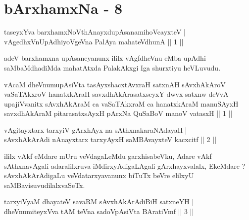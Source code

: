 \chapter{bArxhamxNa - 8}

\begin{shl}
taseyxYva barxhamxNoV\s thAnayxdupAsanamihoVcayxteV | \\
vAgedhxVnUpAdhiyoVgeVna PalAya mahateV\s dhunA \hfill ||  1 || 
\end{shl}

\begin{artha}
adeV barxhamxna upAsaneyanunx ililx vAgfdheVnu eMba upAdhi saMbaMdhadiMda mahatAtxda PalakAkxgi Iga shurxtiyu heVLuvudu.
\end{artha}

\begin{shl}
vAcaM dheVnumupAsiVta tasAyxshacxtAvxraH satxnAH sAvxhAkAroV vaSaTAkxroV hanatxkAraH savxdhAkArasatxseyxY dwvx satxnw deVvA upajiVvanitx sAvxhAkAraM ca vaSaTAkxraM ca hanatxkAraM manuSAyxH savxdhAkAraM pitarasatxsAyxH pArxNa QuSaBoV manoV vatasxH || 1 ||
\end{shl}


\begin{shl}
vAgitayxtarx tarxyiV gArxhAyx na sAthxnakaraNAdayaH | \\
sAvxhAkArAdi nAnayxtarx tarxyAyxH saMBAvayxteV kacxcitf \hfill ||  2 || 
\end{shl}

\begin{artha}
ililx vAkf eMdare mUru veVdagaLeMdu garxhisabeVku, Adare vAkf sAthxnavAgali adaralilxruva iMdirxyAdigaLAgali gArxhayxvalalx, EkeMdare ? sAvxhAkArAdigaLu veVdatarxyavanunx biTuTx beVre elilxyU saMBavisuvudilalxvaSeTx.
\end{artha}

\begin{shl}
tarxyiVyaM dhayateV savaRM sAvxhAkArAdiBiH satxneYH | \\
dheVnumiteyxVva tAM teVna sadoVpAsiVta BAratiVmf \hfill ||  3 || 
\end{shl}


